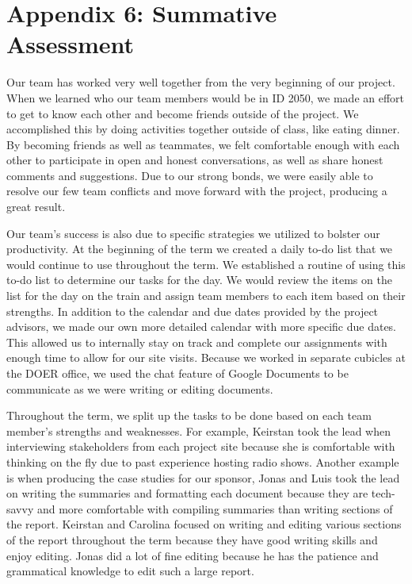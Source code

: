 \section*{Appendix 6: Summative Assessment}
\par Our team has worked very well together from the very beginning of our project. When we learned who our team members would be in ID 2050, we made an effort to get to know each other and become friends outside of the project. We accomplished this by doing activities together outside of class, like eating dinner. By becoming friends as well as teammates, we felt comfortable enough with each other to participate in open and honest conversations, as well as share honest comments and suggestions. Due to our strong bonds, we were easily able to resolve our few team conflicts and move forward with the project, producing a great result.
\par Our team’s success is also due to specific strategies we utilized to bolster our productivity. At the beginning of the term we created a daily to-do list that we would continue to use throughout the term. We established a routine of using this to-do list to determine our tasks for the day. We would review the items on the list for the day on the train and assign team members to each item based on their strengths. In addition to the calendar and due dates provided by the project advisors, we made our own more detailed calendar with more specific due dates. This allowed us to internally stay on track and complete our assignments with enough time to allow for our site visits. Because we worked in separate cubicles at the DOER office, we used the chat feature of Google Documents to be communicate as we were writing or editing documents. 
\par Throughout the term, we split up the tasks to be done based on each team member’s strengths and weaknesses. For example, Keirstan took the lead when interviewing stakeholders from each project site because she is comfortable with thinking on the fly due to past experience hosting radio shows. Another example is when producing the case studies for our sponsor, Jonas and Luis took the lead on writing the summaries and formatting each document because they are tech-savvy and more comfortable with compiling summaries than writing sections of the report. Keirstan and Carolina focused on writing and editing various sections of the report throughout the term because they have good writing skills and enjoy editing. Jonas did a lot of fine editing because he has the patience and grammatical knowledge to edit such a large report.

